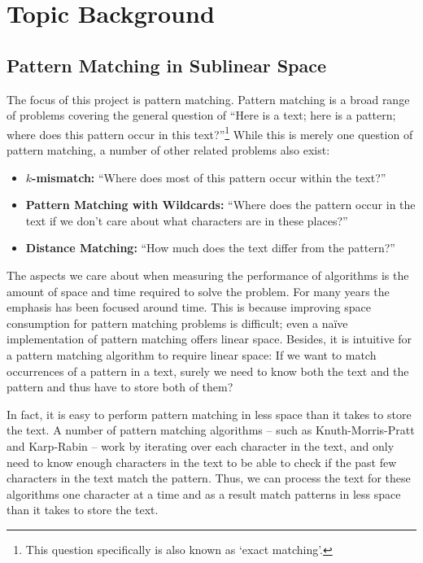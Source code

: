 \documentclass[ %
                    author={Dominic Joseph Moylett},
                    degree={MEng},
                     title={Dictionary Matching with Fingerprints},
                  subtitle={An Empirical Analysis},
                      type={research},
                      year={2015} ]{dissertation}
\begin{document}
\section{Topic Background}

\subsection{Pattern Matching in Sublinear Space}

The focus of this project is pattern matching. Pattern matching is a broad range of problems covering the general question of ``Here is a text; here is a pattern; where does this pattern occur in this text?''\footnote{This question specifically is also known as `exact matching'.} While this is merely one question of pattern matching, a number of other related problems also exist:

\begin{itemize}
  \item \textbf{$k$-mismatch:} ``Where does most of this pattern occur within the text?''
  \item \textbf{Pattern Matching with Wildcards:} ``Where does the pattern occur in the text if we don't care about what characters are in these places?''
  \item \textbf{Distance Matching:} ``How much does the text differ from the pattern?''
\end{itemize}

The aspects we care about when measuring the performance of algorithms is the amount of space and time required to solve the problem. For many years the emphasis has been focused around time. This is because improving space consumption for pattern matching problems is difficult; even a na\"{i}ve implementation of pattern matching offers linear space. Besides, it is intuitive for a pattern matching algorithm to require linear space: If we want to match occurrences of a pattern in a text, surely we need to know both the text and the pattern and thus have to store both of them?

In fact, it is easy to perform pattern matching in less space than it takes to store the text. A number of pattern matching algorithms -- such as Knuth-Morris-Pratt \cite{kmp} and Karp-Rabin \cite{5390135} -- work by iterating over each character in the text, and only need to know enough characters in the text to be able to check if the past few characters in the text match the pattern. Thus, we can process the text for these algorithms one character at a time and as a result match patterns in less space than it takes to store the text.
\end{document}

